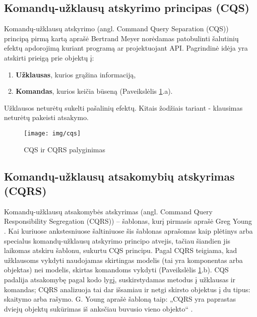 \subsection{Komandų-užklausų atskyrimo principas (CQS)}

Komandų-užklausų atskyrimo (angl. Command Query Separation (CQS)) principą pirmą kartą aprašė Bertrand Meyer \cite{Meyer:1988:OSC:534929} norėdamas patobulinti šalutinių efektų apdorojimą kuriant programą ar projektuojant API. Pagrindinė idėja yra atskirti prieigą prie objektų į:

\begin{enumerate}

  \item \textbf{Užklausas}, kurios grąžina informaciją,

  \item \textbf{Komandas}, kurios keičia būseną (Paveikslėlis \ref{img:cqs}.a).

\end{enumerate}

Užklausos neturėtų sukelti pašalinių efektų. Kitais žodžiais tariant - klausimas neturėtų pakeisti atsakymo.

\begin{figure}[H]
    \centering
    \texttt{[image: img/cqs]}
    \caption{CQS ir CQRS palyginimas}
    \label{img:cqs}
\end{figure}

\subsection{Komandų-užklausų atsakomybių atskyrimas (CQRS)}

Komandų-užklausų atsakomybės atskyrimas (angl. Command Query Responsibility Segregation (CQRS)) – šablonas, kurį pirmasis aprašė Greg Young \cite{Young:CQRS2013}. Kai kuriuose ankstesniuose šaltiniuose šis šablonas aprašomas kaip plėtinys arba specialus komandų-užklausų atskyrimo principo atvejis, tačiau šiandien jis laikomas atskiru šablonu, sukurtu CQS principu. Pagal CQRS teigiama, kad užklausoms vykdyti naudojamas skirtingas modelis (tai yra komponentas arba objektas) nei modelis, skirtas komandoms vykdyti (Paveikslėlis \ref{img:cqs}.b). CQS padalija atsakomybę pagal kodo lygį, suskirstydamas metodus į užklausas ir komandas; CQRS analizuoja tai dar išsamiau ir netgi skirsto objektus į du tipus: skaitymo arba rašymo. G. Young aprašė šabloną taip: „CQRS yra paprastas dviejų objektų sukūrimas iš anksčiau buvusio vieno objekto“ \cite{Young:CQRS2010}.

